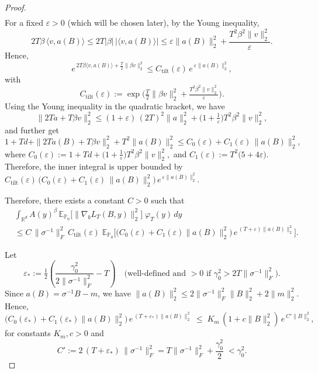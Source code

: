 \documentclass[11pt]{article}
\theoremstyle{definition}
\newcommand{\R}{\mathbb{R}}
\newcommand{\E}{\mathbb{E}}
\begin{document}
\begin{proof}
\begin{align*}
\end{align*}
For a fixed $\varepsilon > 0$ (which will be chosen later), by the Young inequality, 
\[
2T\beta\,\langle v,a(B)\rangle
\leq
2T|\beta|\,|\langle v,a(B)\rangle|
\leq
\varepsilon\|a(B)\|_2^2
+
\frac{T^2\beta^2\|v\|_2^2}{\varepsilon}.
\]
Hence, 
\[
e^{\,2T\beta\langle v,a(B)\rangle+\frac{T}{2}\|\beta v\|_2^2}
\le C_{\mathrm{tilt}}(\varepsilon)\,e^{\,\varepsilon\|a(B)\|_2^2},
\]
with
\[
C_{\mathrm{tilt}}(\varepsilon):=\exp\!\Big(\tfrac{T}{2}\|\beta v\|_2^2+\tfrac{T^2\beta^2\|v\|_2^2}{\varepsilon}\Big).
\]
Using the Young inequality in the quadratic bracket, we have
\[
\|2Ta+T\beta v\|_2^2\le (1+\varepsilon)\,(2T)^2\|a\|_2^2+\Big(1+\tfrac1\varepsilon\Big)T^2\beta^2\|v\|_2^2,
\]
and further get
\[
1+Td+\|2Ta(B)+T\beta v\|_2^2+T^2\|a(B)\|_2^2
\le C_0(\varepsilon)+C_1(\varepsilon)\,\|a(B)\|_2^2,
\]where $C_0(\varepsilon):=1+Td+\Big(1+\tfrac{1}{\varepsilon}\Big)T^2\beta^2\|v\|_2^2,$ and $C_1(\varepsilon):=T^2\big(5+4\varepsilon\big).$
Therefore, the inner integral is upper bounded by
$C_{\mathrm{tilt}}(\varepsilon)\,\bigl(C_0(\varepsilon)+C_1(\varepsilon)\,\|a(B)\|_2^2\bigr)\,e^{\,\varepsilon\|a(B)\|_2^2}.$

Therefore, there exists a constant $C > 0$ such that
\begin{align*}
    &\int_{\R^d} A(y)^{\beta}\,\E_{\mathbb{P}_0}\big[\|\nabla_b L_T(B,y)\|_2^2\big]\;\varphi_T(y)\,dy \\
    &\leq C\,\|\sigma^{-1}\|_F^2\,C_{\mathrm{tilt}}(\varepsilon)\;
\E_{\mathbb{P}_0}\!\Big[\bigl(C_0(\varepsilon)+C_1(\varepsilon)\|a(B)\|_2^2\bigr)\,e^{\,(T+\varepsilon)\|a(B)\|_2^2}\Big].
\end{align*}

Let
\[
\varepsilon_*:=\tfrac12\!\left(\frac{\gamma_0^2}{2\|\sigma^{-1}\|_F^2}-T\right)
\quad\text{(well-defined and $>0$ if }\gamma_0^2>2T\|\sigma^{-1}\|_F^2).
\]
Since $a(B)=\sigma^{-1}B-m$, we have $\|a(B)\|_2^2\le 2\|\sigma^{-1}\|_F^2\|B\|_2^2+2\|m\|_2^2$. Hence, 
\begin{equation}\label{goal}
\bigl(C_0(\varepsilon_*)+C_1(\varepsilon_*)\|a(B)\|_2^2\bigr)\,e^{\,(T+\varepsilon_*)\|a(B)\|_2^2}
\;\le\;K_m\,(1+c\|B\|_2^2)\,e^{\,C'\|B\|_2^2},    
\end{equation}
for constants $K_m,c>0$ and
\[
C':=2\,(T+\varepsilon_*)\,\|\sigma^{-1}\|_F^2
= T\|\sigma^{-1}\|_F^2+\frac{\gamma_0^2}{2}\;<\gamma_0^2.
\]


\end{proof}
\end{document}
